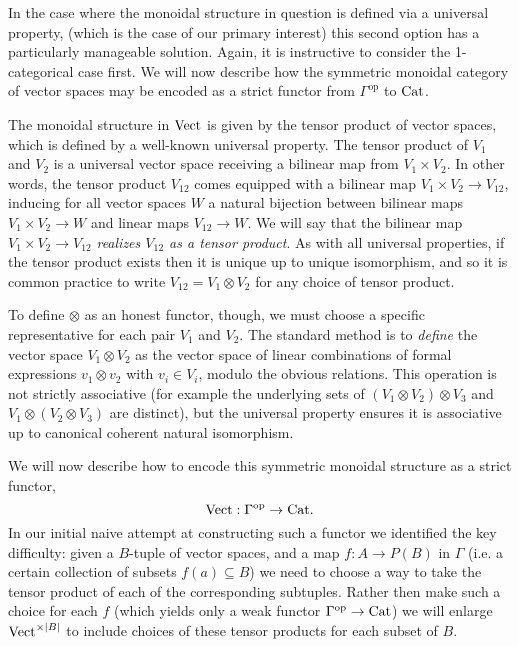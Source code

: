 \documentclass{amsart}
\begin{document}
In the case where the monoidal structure in question is defined via a universal property, (which is the case of our primary interest) this second option has a particularly manageable solution. Again, it is instructive to consider the 1-categorical case first. We will now describe how the symmetric monoidal category of vector spaces may be encoded as a strict functor from $\Gamma^\text{op}$ to $\mathrm{Cat}$. 

The monoidal structure in $\mathrm{Vect}$ is given by the tensor product of vector spaces, which is defined by a well-known universal property. The tensor product of $V_1$ and $ V_2$ is a universal vector space receiving a bilinear map from $V_1 \times V_2$. In other words, the tensor product $V_{12}$ comes equipped with a bilinear map  $V_1 \times V_2 \to V_{12}$, inducing for all vector spaces $W$ a natural bijection between bilinear maps $V_1 \times V_2 \to W$ and linear maps $V_{12} \to W$. We will say that the bilinear map  $V_1 \times V_2 \to V_{12}$ {\em realizes $V_{12}$ as a tensor product}. As with all universal properties, if the tensor product exists then it is unique up to unique isomorphism, and so it is common practice to write $V_{12} = V_1 \otimes V_2$ for any choice of tensor product.

To define $\otimes$ as an honest functor, though, we must choose a specific representative for each pair $V_1$ and $V_2$. The standard method is to {\em define} the vector space $V_1 \otimes V_2$ as the vector space of linear combinations of formal expressions $v_1 \otimes v_2$ with $v_i \in V_i$, modulo the obvious relations. This operation is not strictly associative (for example the underlying sets of $(V_1 \otimes V_2) \otimes V_3$ and $V_1 \otimes (V_2 \otimes V_3)$ are distinct), but the universal property ensures it is associative up to canonical coherent natural isomorphism.

We will now describe how to encode this symmetric monoidal structure as a strict functor,
\begin{equation*}
	\mathrm{Vect}: \Gamma^\text{op} \to \mathrm{Cat}.
\end{equation*}  
In our initial naive attempt at constructing such a functor we identified the key difficulty: given a $B$-tuple of vector spaces, and a map $f: A \to P(B)$ in $\Gamma$ (i.e. a certain collection of subsets $f(a) \subseteq B$) we need to choose a way to take the tensor product of each of the corresponding subtuples. Rather then make such a choice for each $f$ (which yields only a weak functor $\Gamma^\text{op} \to \mathrm{Cat}$) we will enlarge $\mathrm{Vect}^{\times |B|}$ to include choices of these tensor products for each subset of $B$. 
\end{document}
